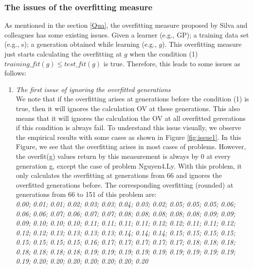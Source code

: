 \subsubsection{The issues of the overfitting measure\cite{2010Vanneschi} }
As mentioned in the section \ref{Qua}, the overfitting measure proposed by Silva and colleagues has some existing issues. Given a learner (e.g., GP); a training data set (e.g., s); a generation obtained while learning (e.g., $g$). This overfitting measure just starts calculating the overfitting at $g$ when the condition (1) $training\_fit(g) \le test\_fit(g)$ is true. Therefore, this leads to some issues as follows: 
\begin{enumerate}
\item \textit{The first issue of ignoring the overfitted generations}\\
We note that if the overfitting arises at generations before the condition (1) is true, then it will ignores the calculation OV at these generations. This also means that it will ignores the calculation the OV at all overfitted gererations if this condition is always fail. To understand this issue visually, we observe the empirical results with some cases as shown in Figure \ref{fig:issue1}. In this Figure, we see that the overfitting arises in most cases of problems. However, the overfit(g) values return by this measurement is always by 0 at every generation g, except the case of problem Nguyen4.Ly. With this problem, it only calculates the overfitting at generations from 66 and ignores the overfitted generations before. The corresponding overfitting (rounded) at generations from 66 to 151 of this problem are: \\
\textit{0.00; 0.01; 0.01; 0.02; 0.03; 0.03; 0.04; 0.03;
0.02; 0.05; 0.05; 0.05; 0.06; \\0.06; 0.06; 
0.07; 0.06; 0.07; 0.07; 0.08; 0.08; 0.08; 0.08; 0.08; 0.09; 0.09;\\ 0.09; 0.10; 0.10; 0.10; 0.11; 0.11; 0.11; 0.11; 0.12; 0.12; 0.11; 0.11; 0.12;\\
0.12; 0.12; 0.13; 0.13; 0.13; 0.13; 0.14; 0.14; 0.14; 0.15; 0.15; 0.15; 0.15;\\
0.15; 0.15; 0.15; 0.15; 0.16; 0.17; 0.17; 0.17; 0.17; 0.17; 0.18; 0.18; 0.18;\\
0.18; 0.18; 0.18; 0.18; 0.19; 0.19; 0.19; 0.19; 0.19; 0.19; 
0.19; 0.19; 0.19; \\
0.19; 0.20; 0.20; 0.20; 0.20; 0.20; 0.20; 0.20 \\
}
\begin{figure}

\end{figure}
\end{enumerate}
